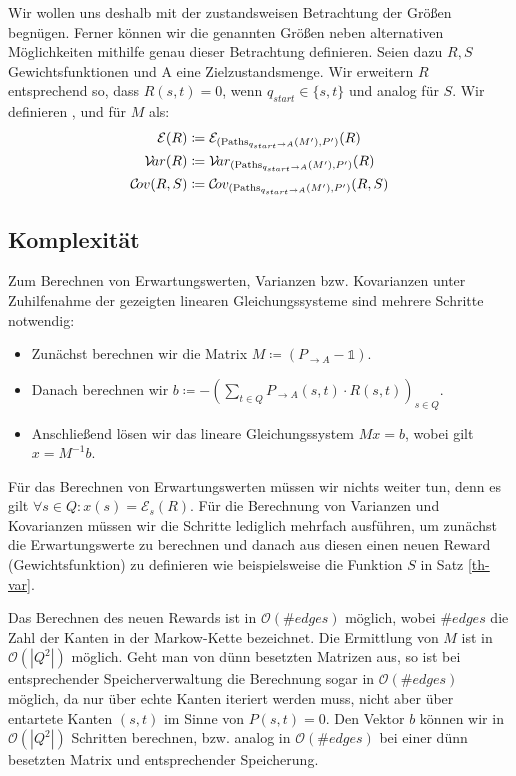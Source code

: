 \documentclass[a4paper]{article}
\newcommand{\mc}{Markow-Kette}
\theoremstyle{nonumberplain}
\begin{document}
	Wir wollen uns deshalb mit der zustandsweisen Betrachtung der Größen begnügen. Ferner können wir die genannten Größen neben alternativen Mög\-lich\-keit\-en mithilfe genau dieser Betrachtung definieren. Seien dazu $R, S$ Gewichtsfunktionen und A eine Zielzustandsmenge. Wir erweitern $R$ entsprechend so, dass $R(s,t) = 0$, wenn $q_{start} \in \{s,t\}$ und analog für $S$. Wir definieren \expect{}, \var{} und \cov{} für $M$ als:
	\begin{align*}
	\mathcal{E}(R) \coloneqq \;& \mathcal{E}_{(\mathrm{Paths}_{q_{start} \rightarrow A}(M'), P')}(R) \\
	\mathcal{V}\!ar(R) \coloneqq \;& \mathcal{V}\!ar_{(\mathrm{Paths}_{q_{start} \rightarrow A}(M'), P')}(R) \\
	\mathcal{C}\!ov(R,S) \coloneqq \;& \mathcal{C}\!ov_{(\mathrm{Paths}_{q_{start} \rightarrow A}(M'), P')}(R,S) \\
	\end{align*}
	
	\subsection{Komplexität}
	
	Zum Berechnen von Erwartungswerten, Varianzen bzw. Kovarianzen unter Zuhilfenahme der gezeigten linearen Gleichungssysteme sind mehrere Schritte notwendig:
	
	\begin{itemize}
		\item Zunächst berechnen wir die Matrix $M \coloneqq (P_{\rightarrow A} - \mathbb{1})$.
		\item Danach berechnen wir $b \coloneqq - \left(\sum_{t \in Q}{ P_{\rightarrow A}(s,t) \cdot R(s,t) }\right)_{s \in Q}$.
		\item Anschließend lösen wir das lineare Gleichungssystem $Mx = b$, wobei gilt $x = M^{-1}b$.
	\end{itemize}
	
	Für das Berechnen von Erwartungswerten müssen wir nichts weiter tun, denn es gilt $\forall s\in Q : x(s) = \mathcal{E}_s(R)$.
	Für die Berechnung von Varianzen und Kovarianzen müssen wir die Schritte lediglich mehrfach ausführen, um zunächst die Erwartungswerte zu berechnen und danach aus diesen einen neuen Reward (Gewichtsfunktion) zu definieren wie beispielsweise die Funktion $S$ in Satz \ref{th-var}.
	
	Das Berechnen des neuen Rewards ist in $\mathcal{O}(\#edges)$ möglich, wobei $\#edges$ die Zahl der Kanten in der \mc{} bezeichnet. Die Ermittlung von $M$ ist in $\mathcal{O}(|Q^2|)$ möglich. Geht man von dünn besetzten Matrizen aus, so ist bei entsprechender Speicherverwaltung die Berechnung sogar in $\mathcal{O}(\#edges)$ möglich, da nur über echte Kanten iteriert werden muss, nicht aber über entartete Kanten $(s,t)$ im Sinne von $P(s,t) = 0$. Den Vektor $b$ können wir in $\mathcal{O}(|Q^2|)$ Schritten berechnen, bzw. analog in $\mathcal{O}(\#edges)$ bei einer dünn besetzten Matrix und entsprechender Speicherung.
	
\end{document}
